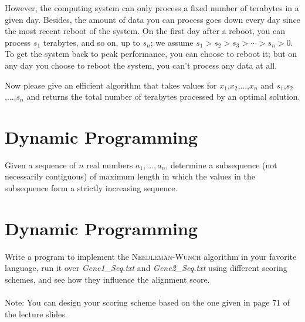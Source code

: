 However, the computing system can only process a fixed number of terabytes in a given day. 
Besides, 
the amount of data you can process goes down every day since the most recent reboot of the system. 
On the first day after a reboot, you can process $s_1$ terabytes, and so on, up to $s_n$; 
we assume $s_1>s_2>s_3>\cdots>s_n>0$. 
To get the system back to peak performance, you can choose to reboot it; 
but on any day you choose to reboot the system, you can't process any data at all.

Now please give an efficient algorithm that takes values for $x_1$,$x_2$,...,$x_n$ 
and $s_1$,$s_2$,...,$s_n$ and returns the total number of terabytes processed by an optimal solution.
%
%
\section{Dynamic Programming}
\noindent
Given a sequence of $n$ real numbers $a_1,...,a_n$, 
determine a subsequence (not necessarily contiguous) of maximum length in which 
the values in the subsequence form a strictly increasing sequence.
%
%
\section{Dynamic Programming}
\noindent
Write a program to implement the \textsc{Needleman-Wunch} algorithm in your favorite language,
run it over \textit{Gene1\_Seq.txt} and \textit{Gene2\_Seq.txt} using different scoring schemes,
and see how they influence the alignment score.
\\ \\
Note: 
You can design your scoring scheme based on the one given in page $71$ of the lecture slides.


